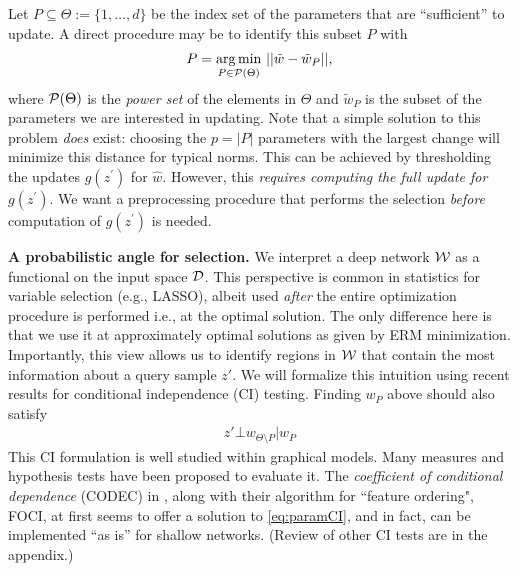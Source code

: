 Let $P \subseteq \Theta:= \{1,\ldots, d\}$ be the index set of the parameters that are ``sufficient'' to update. A direct procedure may be to identify this subset $P$ with
\begin{align}\label{eq:normsel}
P = \underset{P \in \mathcal{P}(\Theta)}{\arg\min} \ ||\tilde{w} - \tilde{w}_P||,
\end{align}
where $\mathcal{P}(\Theta)$ is the {\em power set} of the elements in $\Theta$ and $\tilde{w}_P$ is the subset of the parameters we are interested in updating. 
Note that a simple solution to this problem {\em does} exist: choosing the $p=|P|$ parameters with the largest change will minimize this distance for typical norms. This can be achieved by thresholding the updates $g(z^\prime)$ for $\hat{w}$. However, this \textit{requires computing the full update for $g(z^\prime)$}. We want a preprocessing procedure that performs the selection \textit{before} computation of $g(z^\prime)$ is needed.

\noindent\textbf{A probabilistic angle for selection.} 
We interpret a deep network $\mathcal{W}$ as a functional on the input space $\mathcal{D}$. This perspective is common in statistics for variable selection (e.g., LASSO), albeit used {\em after} the entire optimization procedure is performed i.e., at the optimal solution. The only difference here is that we use it at approximately optimal solutions as given by ERM minimization. Importantly, this view allows us to identify regions in $\mathcal{W}$ that contain the most information about a query sample $z'$. 
We will formalize this intuition using recent results for conditional independence (CI) testing.
Finding $w_P$ above should also satisfy
\begin{align}\label{eq:paramCI}
    z' \bot w_{\Theta\setminus P} | w_P
\end{align}
This CI formulation is well studied within graphical models. Many measures and hypothesis tests have been proposed to evaluate it.
The {\em coefficient of conditional dependence} (CODEC)  in \cite{codec}, along with their algorithm for ``feature ordering", FOCI, at first seems to offer a solution to  \eqref{eq:paramCI}, and in fact, can be implemented ``as is'' for shallow networks. (Review of other CI tests are in the appendix.)



